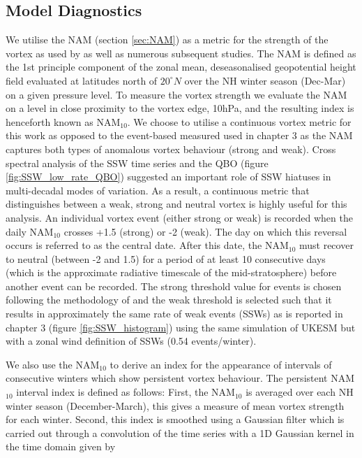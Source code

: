 \subsection{Model Diagnostics}
\label{sec:model_diagnostics_surface}
We utilise the NAM (section \ref{sec:NAM}) as a metric for the strength of the vortex as used by \cite{baldwinStratospheric2001a} as well as numerous subsequent studies. The NAM is defined as the 1st principle component of the zonal mean, deseasonalised geopotential height field evaluated at latitudes north of $20^{\circ}N$ over the NH winter season (Dec-Mar) on a given pressure level. To measure the vortex strength we evaluate the NAM on a level in close proximity to the vortex edge, 10hPa, and the resulting index is henceforth known as NAM$_{10}$. We choose to utilise a continuous vortex metric for this work as opposed to the event-based measured used in chapter 3 as the NAM captures both types of anomalous vortex behaviour (strong and weak). Cross spectral analysis of the SSW time series and the QBO (figure \ref{fig:SSW_low_rate_QBO}) suggested an important role of SSW hiatuses in multi-decadal modes of variation. As a result, a continuous metric that distinguishes between a weak, strong and neutral vortex is highly useful for this analysis. An individual vortex event (either strong or weak) is recorded when the daily NAM$_{10}$ crosses +1.5 (strong) or -2 (weak). The day on which this reversal occurs is referred to as the central date. After this date, the NAM$_10$ must recover to neutral (between -2 and 1.5) for a period of at least 10 consecutive days (which is the approximate radiative timescale of the mid-stratosphere) before another event can be recorded. The strong threshold value for events is chosen following the methodology of \cite{baldwinStratospheric2001a} and the weak threshold is selected such that it results in approximately the same rate of weak events (SSWs) as is reported in chapter 3 (figure \ref{fig:SSW_histogram}) using the same simulation of UKESM but with a zonal wind definition of SSWs (0.54 events/winter).

We also use the NAM$_{10}$ to derive an index for the appearance of intervals of consecutive winters which show persistent vortex behaviour. The persistent NAM$_{10}$ interval index is defined as follows: First, the NAM$_{10}$ is averaged over each NH winter season (December-March), this gives a measure of mean vortex strength for each winter. Second, this index is smoothed using a Gaussian filter which is carried out through a convolution of the time series with a 1D Gaussian kernel in the time domain given by

